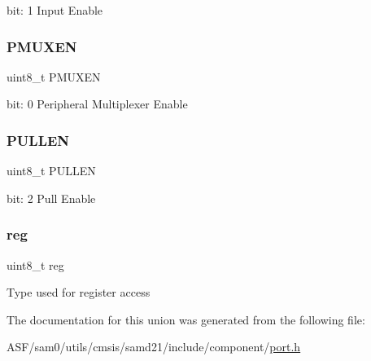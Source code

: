 bit\+: 1 Input Enable \mbox{\label{union_p_o_r_t___p_i_n_c_f_g___type_a839f842b1cfeac2e9a75c20693a89975}} 
\subsubsection{\texorpdfstring{PMUXEN}{PMUXEN}}
{\footnotesize\ttfamily uint8\+\_\+t P\+M\+U\+X\+EN}

bit\+: 0 Peripheral Multiplexer Enable \mbox{\label{union_p_o_r_t___p_i_n_c_f_g___type_a436e1cf6b753084817dce9449fcfff64}} 
\subsubsection{\texorpdfstring{PULLEN}{PULLEN}}
{\footnotesize\ttfamily uint8\+\_\+t P\+U\+L\+L\+EN}

bit\+: 2 Pull Enable \mbox{\label{union_p_o_r_t___p_i_n_c_f_g___type_a9428adc9af4653a2050e2536b55dec8d}} 
\subsubsection{\texorpdfstring{reg}{reg}}
{\footnotesize\ttfamily uint8\+\_\+t reg}

Type used for register access 

The documentation for this union was generated from the following file\+:\begin{DoxyCompactItemize}
\item 
A\+S\+F/sam0/utils/cmsis/samd21/include/component/\mbox{\hyperlink{utils_2cmsis_2samd21_2include_2component_2port_8h}{port.\+h}}\end{DoxyCompactItemize}
